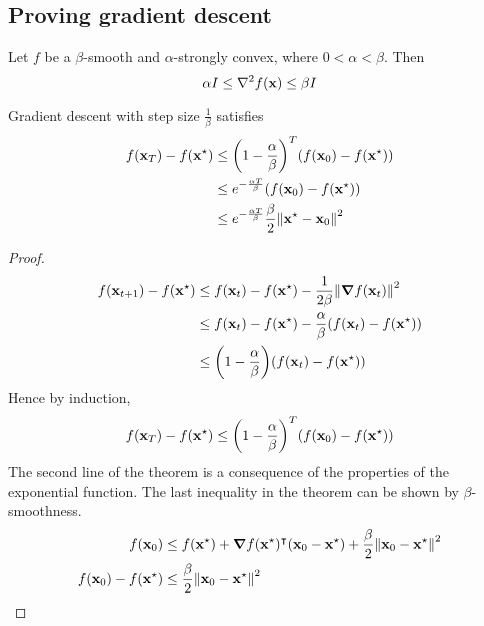 \subsection{Proving gradient descent}
Let \(f\) be a \(\beta\)-smooth and \(\alpha\)-strongly convex, where \(0 < \alpha < \beta\).
Then
\[
	\alpha I \leq \laplacian{f(\vb x)} \leq \beta I
\]
\begin{theorem}
	Gradient descent with step size \(\frac{1}{\beta}\) satisfies
	\begin{align*}
		f(\vb x_T) - f(\vb x^\star) & \leq \qty(1 - \frac{\alpha}{\beta})^T \qty(f(\vb x_0) - f(\vb x^\star)) \\&\leq e^{-\frac{\alpha T}{\beta}} \qty(f(\vb x_0) - f(\vb x^\star)) \\&\leq e^{-\frac{\alpha T}{\beta}} \frac{\beta}{2} \norm{\vb x^\star - \vb x_0}^2
	\end{align*}
\end{theorem}

\begin{proof}
	\begin{align*}
		f(\vb x_{t+1}) - f(\vb x^\star) & \leq f(\vb x_t) - f(\vb x^\star) - \frac{1}{2\beta} \norm{\grad{f(\vb x_t)}}^2            \\
		                                & \leq f(\vb x_t) - f(\vb x^\star) - \frac{\alpha}{\beta} \qty(f(\vb x_t) - f(\vb x^\star)) \\
		                                & \leq \qty(1 - \frac{\alpha}{\beta}) \qty(f(\vb x_t) - f(\vb x^\star))
	\end{align*}
	Hence by induction,
	\[
		f(\vb x_T) - f(\vb x^\star) \leq \qty(1 - \frac{\alpha}{\beta})^T \qty(f(\vb x_0) - f(\vb x^\star))
	\]
	The second line of the theorem is a consequence of the properties of the exponential function.
	The last inequality in the theorem can be shown by \(\beta\)-smoothness.
	\begin{align*}
		f(\vb x_0)                  & \leq f(\vb x^\star) + \grad{f(\vb x^\star)}^\intercal (\vb x_0 - \vb x^\star) + \frac{\beta}{2}\norm{\vb x_0 - \vb x^\star}^2 \\
		f(\vb x_0) - f(\vb x^\star) & \leq \frac{\beta}{2}\norm{\vb x_0 - \vb x^\star}^2                                                                             \\
	\end{align*}
\end{proof}

